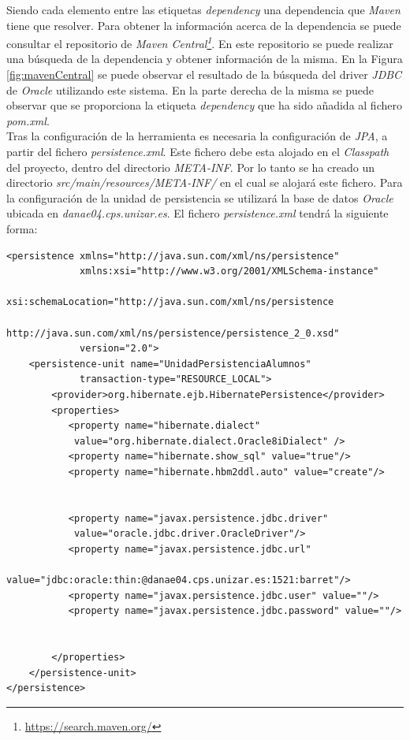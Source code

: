 \documentclass[11pt,a4paper]{article}
\begin{document}
Siendo cada elemento entre las etiquetas \emph{dependency} una dependencia que \emph{Maven} tiene que resolver. Para obtener la información acerca de la dependencia se puede consultar el repositorio de \emph{Maven Central\footnote{\url{https://search.maven.org/}}}. En este repositorio se puede realizar una búsqueda de la dependencia y obtener información de la misma. En la Figura \ref{fig:mavenCentral} se puede observar el resultado de la búsqueda del driver \emph{JDBC} de \emph{Oracle} utilizando este sistema. En la parte derecha de la misma se puede observar que se proporciona la etiqueta \emph{dependency} que ha sido añadida al fichero \emph{pom.xml}.\\

Tras la configuración de la herramienta es necesaria la configuración de \emph{JPA}, a partir del fichero \emph{persistence.xml}. Este fichero debe esta alojado en el \emph{Classpath} del proyecto, dentro del directorio \emph{META-INF}. Por lo tanto se ha creado un directorio \emph{src/main/resources/META-INF/} en el cual se alojará este fichero. Para la configuración de la unidad de persistencia se utilizará la base de datos \emph{Oracle} ubicada en \emph{danae04.cps.unizar.es}. El fichero \emph{persistence.xml} tendrá la siguiente forma:

\begin{lstlisting}
<persistence xmlns="http://java.sun.com/xml/ns/persistence"
             xmlns:xsi="http://www.w3.org/2001/XMLSchema-instance"
             xsi:schemaLocation="http://java.sun.com/xml/ns/persistence 
             http://java.sun.com/xml/ns/persistence/persistence_2_0.xsd" 
             version="2.0">
	<persistence-unit name="UnidadPersistenciaAlumnos"
			 transaction-type="RESOURCE_LOCAL">
		<provider>org.hibernate.ejb.HibernatePersistence</provider>
		<properties>
		   <property name="hibernate.dialect" 
		   	value="org.hibernate.dialect.Oracle8iDialect" />
		   <property name="hibernate.show_sql" value="true"/>		
		   <property name="hibernate.hbm2ddl.auto" value="create"/>
		  
		   
		   <property name="javax.persistence.jdbc.driver" 
		   	value="oracle.jdbc.driver.OracleDriver"/>
		   <property name="javax.persistence.jdbc.url" 
		   	value="jdbc:oracle:thin:@danae04.cps.unizar.es:1521:barret"/>
		   <property name="javax.persistence.jdbc.user" value=""/>
		   <property name="javax.persistence.jdbc.password" value=""/>		   
		   

		</properties>
	</persistence-unit>
</persistence>
\end{lstlisting}
\end{document}
